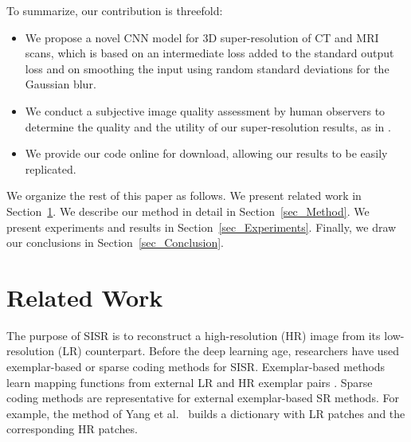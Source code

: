 \documentclass{ieeeaccess}
\begin{document}
To summarize, our contribution is threefold:
\begin{itemize}
\item We propose a novel CNN model for 3D super-resolution of CT and MRI scans, which is based on an intermediate loss added to the standard output loss and on smoothing the input using random standard deviations for the Gaussian blur.
\item We conduct a subjective image quality assessment by human observers to determine the quality and the utility of our super-resolution results, as in \cite{You-TMI-2019}.
\item We provide our code online for download, allowing our results to be easily replicated.
\end{itemize}

We organize the rest of this paper as follows. We present related work in Section~\ref{sec_Related_Work}. We describe our method in detail in Section~\ref{sec_Method}. We present experiments and results in Section~\ref{sec_Experiments}. Finally, we draw our conclusions in Section~\ref{sec_Conclusion}.

\section{Related Work}
\label{sec_Related_Work}





























The purpose of SISR is to reconstruct a high-resolution (HR) image from its low-resolution (LR) counterpart. Before the deep learning age, researchers have used exemplar-based or sparse coding methods for SISR. Exemplar-based methods learn mapping functions from external LR and HR exemplar pairs \cite{Bevilacqua-BMVC-2012, Chang-CVPR-2004, Dai-CGF-2015}. Sparse coding methods \cite{Yang-TIP-2010} are representative for external exemplar-based SR methods. For example, the method of Yang et al.~\cite{Yang-TIP-2010} builds a dictionary with LR patches and the corresponding HR patches. 
\end{document}
